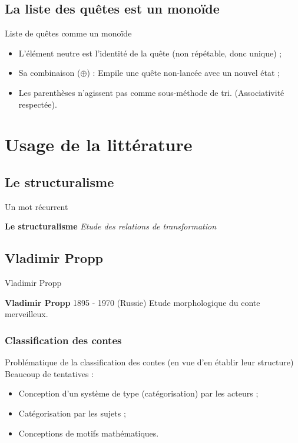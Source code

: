 \documentclass{beamer}
\begin{document}
\subsection{La liste des quêtes est un  monoïde}
\begin{frame}{Liste de quêtes comme un monoïde}
  \begin{itemize}
    \item L'élément neutre est l'identité de la quête (non répétable, donc unique) ;
    \item Sa combinaison ($\oplus$) : Empile une quête non-lancée avec un nouvel état ;
    \item Les parenthèses n'agissent pas comme sous-méthode de tri. (Associativité respectée).
  \end{itemize}
\end{frame}

\section{Usage de la littérature}
\subsection{Le structuralisme}
\begin{frame}{Un mot récurrent}
  \begin{center}
    \begin{block}{\textbf{Le structuralisme}}
      \textit{Etude des relations de transformation}
    \end{block}
  \end{center}
\end{frame}

\subsection{Vladimir Propp}
\begin{frame}{Vladimir Propp}
  \begin{block}{\textbf{Vladimir Propp} 1895 - 1970 (Russie)}
    Etude morphologique du conte merveilleux.
  \end{block}
\end{frame}

\subsubsection{Classification des contes}
\begin{frame}{Problématique de la classification des contes (en vue d'en établir leur structure)}
  Beaucoup de tentatives :
  \begin{itemize}
    \item Conception d'un système de type (catégorisation) par les acteurs ;
    \item Catégorisation par les sujets ;
    \item Conceptions de motifs mathématiques.
  \end{itemize}
\end{frame}
\end{document}
